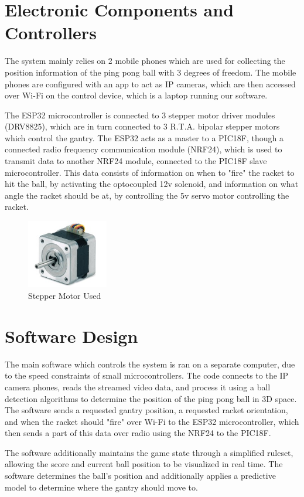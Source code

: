 \section{Electronic Components and Controllers}
The system mainly relies on 2 mobile phones which are used for collecting the position information of the ping pong ball with 3 degrees of freedom. The mobile phones are configured with an app to act as IP cameras, which are then accessed over Wi-Fi on the control device, which is a laptop running our software.

The ESP32 microcontroller is connected to 3 stepper motor driver modules (DRV8825), which are in turn connected to 3 R.T.A. bipolar stepper motors which control the gantry. The ESP32 acts as a master to a PIC18F, though a connected radio frequency communication module (NRF24), which is used to transmit data to another NRF24 module, connected to the PIC18F slave microcontroller. This data consists of information on when to "fire" the racket to hit the ball, by activating the optocoupled 12v solenoid, and information on what angle the racket should be at, by controlling the 5v servo motor controlling the racket.

\begin{figure}[h]
	\centering\includegraphics[height=3cm]{./images/steppermotor}
	\caption{Stepper Motor Used}
\end{figure}

\section{Software Design}
The main software which controls the system is ran on a separate computer, due to the speed constraints of small microcontrollers. The code connects to the IP camera phones, reads the streamed video data, and process it using a ball detection algorithms to determine the position of the ping pong ball in 3D space. The software sends a requested gantry position, a requested racket orientation, and when the racket should "fire" over Wi-Fi to the ESP32 microcontroller, which then sends a part of this data over radio using the NRF24 to the PIC18F.

The software additionally maintains the game state through a simplified ruleset, allowing the score and current ball position to be visualized in real time. The software determines the ball's position and additionally applies a predictive model to determine where the gantry should move to.


